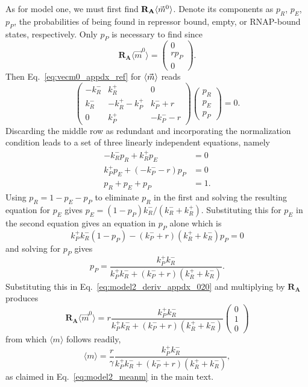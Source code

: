As for model one, we must first find $\mathbf{R_A} \langle\vec{m}^0\rangle$.
Denote its components as $p_R$, $p_E$, $p_P$, the probabilities of being found
in repressor bound, empty, or RNAP-bound states, respectively. Only $p_P$ is
necessary to find since
\begin{equation}
\mathbf{R_A} \langle\vec{m}^0\rangle
= \begin{pmatrix} 0 \\ r p_P \\ 0 \end{pmatrix}.
\label{eq:model2_deriv_appdx_020}
\end{equation}
Then Eq.~\ref{eq:vecm0_appdx_ref} for $\langle\vec{m}\rangle$ reads
\begin{equation}
\begin{pmatrix} -k_R^- & k_R^+ & 0 \\
        k_R^- & -k_R^+ -k_P^+ & k_P^- + r\\
        0 & k_P^+ & -k_P^- - r
\end{pmatrix}
\begin{pmatrix}
    p_R \\ p_E \\ p_P
\end{pmatrix}
= 0.
\label{eq:model2_K-R+R_for_m0}
\end{equation}
Discarding the middle row as redundant and incorporating the normalization
condition leads to a set of three linearly independent equations, namely
\begin{align}
-k_R^- p_R + k_R^+ p_E &= 0 \\
k_P^+ p_E + (-k_P^- - r) p_P &= 0 \\
p_R + p_E + p_P &= 1.
\end{align}
Using $p_R = 1 - p_E - p_P$ to eliminate $p_R$ in the first and solving the
resulting equation for $p_E$ gives
$p_E = (1 - p_P){k_R^-}/{(k_R^- + k_R^+)}$.
Substituting this for $p_E$ in the second equation gives an equation in
$p_P$ alone which is
\begin{equation}
k_P^+ k_R^- (1-p_P) - (k_P^- + r)(k_R^+ + k_R^-) p_P = 0
\end{equation}
and solving for $p_P$ gives
\begin{equation}
p_P = \frac{k_P^+ k_R^-}{k_P^+ k_R^- + (k_P^- + r)(k_R^+ + k_R^-)}.
\end{equation}
Substituting this in Eq.~\ref{eq:model2_deriv_appdx_020} and multiplying by
$\mathbf{R_A}$ produces
\begin{equation}
\mathbf{R_A} \langle\vec{m}^0\rangle
= r \frac{k_P^+ k_R^-} {k_P^+ k_R^- + (k_P^- + r)(k_R^+ + k_R^-)}
\begin{pmatrix} 0 \\ 1 \\ 0 \end{pmatrix}
\end{equation}
from which $\langle{m}\rangle$ follows readily,
\begin{equation}
\langle{m}\rangle = \frac{r}{\gamma}
        \frac{k_P^+ k_R^-} {k_P^+ k_R^- + (k_P^- + r)(k_R^+ + k_R^-)},
\label{eq:model2_meanm_appdx}
\end{equation}
as claimed in Eq.~\ref{eq:model2_meanm} in the main text.

